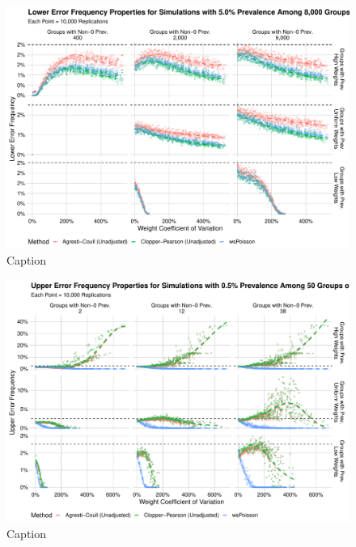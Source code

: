 \documentclass[AMA,STIX1COL]{WileyNJD-v2}
\begin{document}
\begin{figure}
    \centering
    \includegraphics[width=\textwidth]{figures/perfect_lower_error_frequency_8000_0_05_reduced.pdf}
    \caption{Caption}
    \label{fig:perfect_lower_error_frequency_8000_0_05_reduced.pdf}
\end{figure}

\begin{figure}
    \centering
    \includegraphics[width=\textwidth]{figures/perfect_upper_error_frequency_50_0_005_reduced.pdf}
    \caption{Caption}
    \label{fig:perfect_upper_error_frequency_50_0_005_reduced}
\end{figure}
\end{document}
